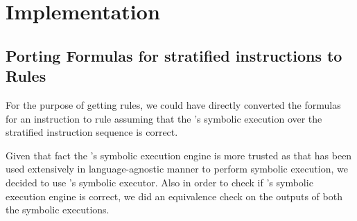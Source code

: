 \section{Implementation}

\subsection{Porting Formulas for stratified instructions to \K Rules}

For the purpose of getting  \K rules, we could have directly converted the \Strata formulas
for an instruction to \K rule assuming that the \Strata's symbolic execution over the 
stratified instruction sequence is correct.

Given that fact the \K's symbolic execution engine is more trusted as 
that has been used extensively in language-agnostic manner to perform symbolic
execution, we decided to use \K's symbolic executor. Also in order to check 
if \Strata's symbolic execution engine is correct, we did an equivalence check on 
the outputs of both the symbolic executions.   
 

